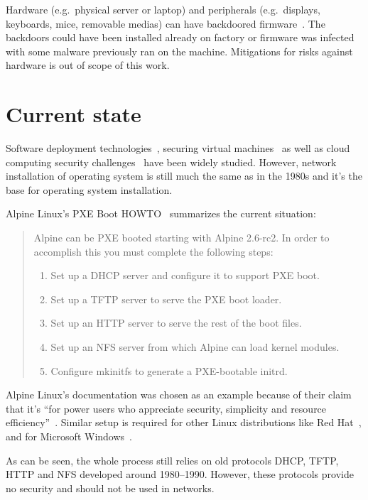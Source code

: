 Hardware (e.g.\ physical server or laptop) and peripherals (e.g.\
displays, keyboards, mice, removable medias) can have backdoored
firmware~\cite{swierczynski2016interdiction}. The backdoors could have
been installed already on factory or firmware was infected with some
malware previously ran on the machine. Mitigations for risks against
hardware is out of scope of this work.


\section{Current state}

Software deployment technologies~\cite{SoftDep}, securing virtual
machines~\cite{Garfinkel2005} as well as cloud computing security
challenges~\cite{Owens2010}\cite{Hashizume2013} have been widely
studied. However, network installation of operating system is still
much the same as in the 1980s and it's the base for operating system installation.

Alpine Linux's PXE Boot HOWTO~\cite{alpine-pxe-boot-howto} summarizes
the current situation:

\begin{quote}
Alpine can be PXE booted starting with Alpine 2.6-rc2. In order to
accomplish this you must complete the following steps:

\begin{enumerate}
\item Set up a DHCP server and configure it to support PXE boot.
\item Set up a TFTP server to serve the PXE boot loader.
\item Set up an HTTP server to serve the rest of the boot files.
\item Set up an NFS server from which Alpine can load kernel modules.
\item Configure mkinitfs to generate a PXE-bootable initrd.
\end{enumerate}
\end{quote}

Alpine Linux's documentation was chosen as an example because of their
claim that it's ``for power users who appreciate security, simplicity
and resource efficiency''~\cite{alpine-about}. Similar setup is
required for other Linux distributions like Red
Hat~\cite{redhat-network-install}, and for Microsoft
Windows~\cite{windows-network-install}.

As can be seen, the whole process still relies on old protocols DHCP,
TFTP, HTTP and NFS developed around 1980--1990. However, these
protocols provide no security and should not be used in
networks.

